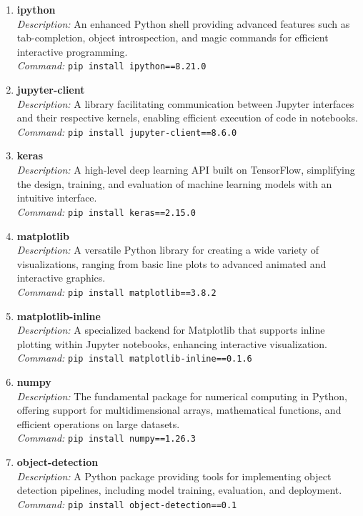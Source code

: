 \begin{enumerate}
	\item \textbf{ipython} \\
	\emph{Description:} An enhanced Python shell providing advanced features such as tab-completion, object introspection, and magic commands for efficient interactive programming. \\
	\emph{Command:} \texttt{pip install ipython==8.21.0}
	
	\item \textbf{jupyter-client} \\
	\emph{Description:} A library facilitating communication between Jupyter interfaces and their respective kernels, enabling efficient execution of code in notebooks. \\
	\emph{Command:} \texttt{pip install jupyter-client==8.6.0}
	
	\item \textbf{keras} \\
	\emph{Description:} A high-level deep learning API built on TensorFlow, simplifying the design, training, and evaluation of machine learning models with an intuitive interface. \\
	\emph{Command:} \texttt{pip install keras==2.15.0}
	
	\item \textbf{matplotlib} \\
	\emph{Description:} A versatile Python library for creating a wide variety of visualizations, ranging from basic line plots to advanced animated and interactive graphics. \\
	\emph{Command:} \texttt{pip install matplotlib==3.8.2}
	
	\item \textbf{matplotlib-inline} \\
	\emph{Description:} A specialized backend for Matplotlib that supports inline plotting within Jupyter notebooks, enhancing interactive visualization. \\
	\emph{Command:} \texttt{pip install matplotlib-inline==0.1.6}
	
	\item \textbf{numpy} \\
	\emph{Description:} The fundamental package for numerical computing in Python, offering support for multidimensional arrays, mathematical functions, and efficient operations on large datasets. \\
	\emph{Command:} \texttt{pip install numpy==1.26.3}
	
	\item \textbf{object-detection} \\
	\emph{Description:} A Python package providing tools for implementing object detection pipelines, including model training, evaluation, and deployment. \\
	\emph{Command:} \texttt{pip install object-detection==0.1}
	

\end{enumerate}
